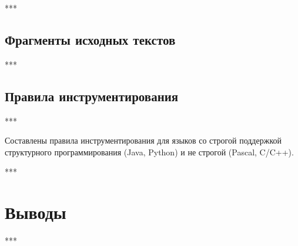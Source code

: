***

\subsection{Фрагменты исходных текстов}

***

\subsection{Правила инструментирования}

***

Составлены правила инструментирования для языков со строгой поддержкой структурного программирования (Java, Python) и не строгой (Pascal, C/C++).

***

\section{Выводы}

***
